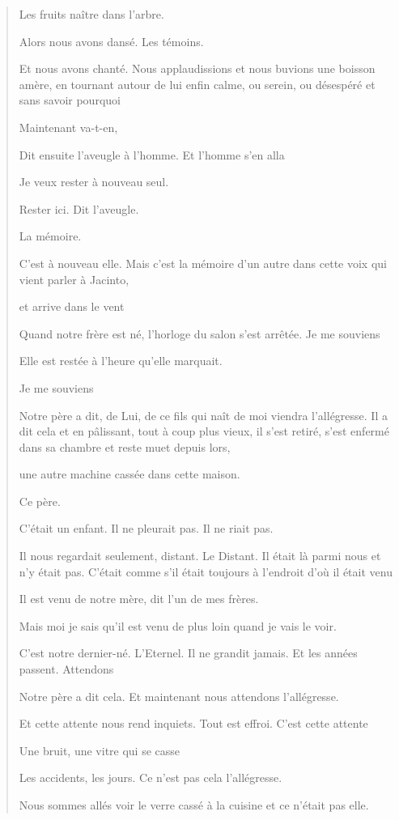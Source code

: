 \begin{quote}
Les fruits naître dans l'arbre.

Alors nous avons dansé. Les témoins.

Et nous avons chanté. Nous applaudissions et nous buvions une boisson
amère, en tournant autour de lui enfin calme, ou serein, ou désespéré et
sans savoir pourquoi

Maintenant va-t-en,

Dit ensuite l'aveugle à l'homme. Et l'homme s'en alla

Je veux rester à nouveau seul.

Rester ici. Dit l'aveugle.

La mémoire.

C'est à nouveau elle. Mais c'est la mémoire d'un autre dans cette voix
qui vient parler à Jacinto,

et arrive dans le vent

Quand notre frère est né, l'horloge du salon s'est arrêtée. Je me
souviens

Elle est restée à l'heure qu'elle marquait.

Je me souviens

Notre père a dit, de Lui, de ce fils qui naît de moi viendra
l'allégresse. Il a dit cela et en pâlissant, tout à coup plus vieux, il
s'est retiré, s'est enfermé dans sa chambre et reste muet depuis lors,

une autre machine cassée dans cette maison.

Ce père.

C'était un enfant. Il ne pleurait pas. Il ne riait pas.

Il nous regardait seulement, distant. Le Distant. Il était là parmi nous
et n'y était pas. C'était comme s'il était toujours à l'endroit d'où il
était venu

Il est venu de notre mère, dit l'un de mes frères.

Mais moi je sais qu'il est venu de plus loin quand je vais le voir.

C'est notre dernier-né. L'Eternel. Il ne grandit jamais. Et les années
passent. Attendons

Notre père a dit cela. Et maintenant nous attendons l'allégresse.

Et cette attente nous rend inquiets. Tout est effroi. C'est cette
attente

Une bruit, une vitre qui se casse

Les accidents, les jours. Ce n'est pas cela l'allégresse.

Nous sommes allés voir le verre cassé à la cuisine et ce n'était pas
elle.


\end{quote}
